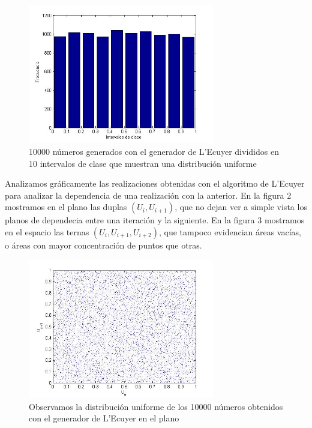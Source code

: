 \documentclass[10pt,journal,compsoc]{IEEEtran}
\begin{document}
\begin{figure}[t]
\label{fig:histogramalecuyer}
\begin{center}
\centering
\includegraphics[width=3.2in]{clases.jpg}
\caption{10000 n\'umeros generados con el generador de L'Ecuyer divididos en 10 intervalos de clase que muestran una distribuci\'on uniforme}
\end{center}
\end{figure}


Analizamos gr\'aficamente las realizaciones obtenidas con el algoritmo de L'Ecuyer para analizar la dependencia de una realizaci\'on 
con la anterior.  En la figura 2 mostramos en el plano las duplas $(U_i, U_{i+1})$, que no dejan ver a simple vista los planos de dependecia entre una
iteraci\'on y la siguiente.  En la figura 3 mostramos en el espacio las ternas $(U_i, U_{i+1}, U_{i+2})$, que tampoco evidencian \'areas vac\'ias, o \'areas con mayor concentraci\'on de puntos que otras.


\begin{figure}[t]
\label{fig:2d}
\begin{center}
\centering
\includegraphics[width=3.2in]{2d_groso.jpg}
\caption{Observamos la distribuci\'on uniforme de los 10000 n\'umeros obtenidos con el generador de L'Ecuyer en el plano}
\end{center}
\end{figure}
\end{document}
